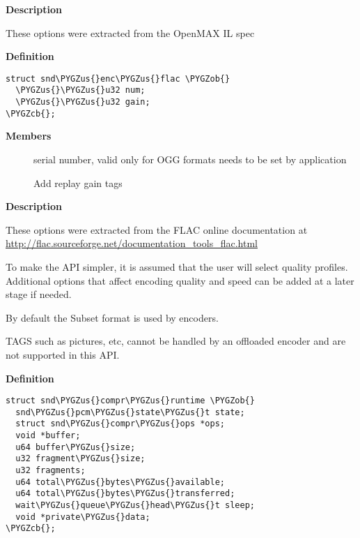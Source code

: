 \documentclass[a4paper,8pt,english]{sphinxmanual}
\def\PYGZus{\char`\_}
\def\PYGZob{\char`\{}
\def\PYGZcb{\char`\}}
\begin{document}
\textbf{Description}

These options were extracted from the OpenMAX IL spec

\begin{fulllineitems}
\label{sound/kernel-api/alsa-driver-api:c.snd_enc_flac}
\end{fulllineitems}


\textbf{Definition}

\begin{Verbatim}[commandchars=\\\{\}]
struct snd\PYGZus{}enc\PYGZus{}flac \PYGZob{}
  \PYGZus{}\PYGZus{}u32 num;
  \PYGZus{}\PYGZus{}u32 gain;
\PYGZcb{};
\end{Verbatim}

\textbf{Members}
\begin{description}
\item[{}] \leavevmode
serial number, valid only for OGG formats
needs to be set by application

\item[{}] \leavevmode
Add replay gain tags

\end{description}

\textbf{Description}

These options were extracted from the FLAC online documentation
at \href{http://flac.sourceforge.net/documentation\_tools\_flac.html}{http://flac.sourceforge.net/documentation\_tools\_flac.html}

To make the API simpler, it is assumed that the user will select quality
profiles. Additional options that affect encoding quality and speed can
be added at a later stage if needed.

By default the Subset format is used by encoders.

TAGS such as pictures, etc, cannot be handled by an offloaded encoder and are
not supported in this API.

\begin{fulllineitems}
\label{sound/kernel-api/alsa-driver-api:c.snd_compr_runtime}
\end{fulllineitems}


\textbf{Definition}

\begin{Verbatim}[commandchars=\\\{\}]
struct snd\PYGZus{}compr\PYGZus{}runtime \PYGZob{}
  snd\PYGZus{}pcm\PYGZus{}state\PYGZus{}t state;
  struct snd\PYGZus{}compr\PYGZus{}ops *ops;
  void *buffer;
  u64 buffer\PYGZus{}size;
  u32 fragment\PYGZus{}size;
  u32 fragments;
  u64 total\PYGZus{}bytes\PYGZus{}available;
  u64 total\PYGZus{}bytes\PYGZus{}transferred;
  wait\PYGZus{}queue\PYGZus{}head\PYGZus{}t sleep;
  void *private\PYGZus{}data;
\PYGZcb{};
\end{Verbatim}
\end{document}

